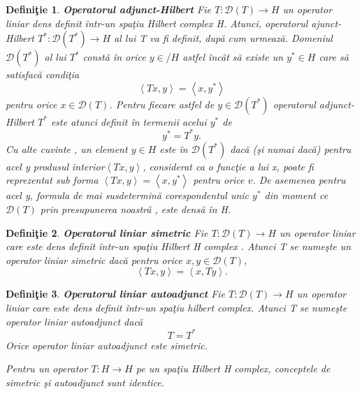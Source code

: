 \documentclass[a4paper,12pt,oneside]{report}
\newtheorem{definition}{Defini\c tie}
\begin{document}
\begin{definition} \textbf{Operatorul adjunct-Hilbert }
Fie \(T : \mathcal{D}\left ( T \right ) \rightarrow H\) un operator liniar dens definit \^{i}ntr-un spa\c{t}iu Hilbert complex H. Atunci, operatorul ajunct-Hilbert \(T^{\ast } : \mathcal{D}\left ( T^{\ast } \right ) \rightarrow H\) al lui T va fi definit, dup\u{a} cum urmeaz\u{a}. Domeniul \(\mathcal{D}\left ( T^{\ast } \right )\) al lui \(T^{\ast }\) const\u{a} \^{i}n orice \(y \in /H\) astfel \^{i}nc\^{a}t s\u{a} existe un \(y^{\ast } \in H\) care s\u{a} satisfac\u{a} condi\c{t}ia
\begin{displaymath}
\left \langle Tx,y \right \rangle = \left \langle x,y^{\ast } \right \rangle
\end{displaymath}
pentru orice \(x \in \mathcal{D}\left ( T \right )\). Pentru fiecare astfel de \(y \in \mathcal{D}\left ( T^{\ast } \right )\) operatorul adjunct-Hilbert \(T^{\ast }\) este atunci definit \^{i}n termenii acelui \(y^{\ast }\) de
\begin{displaymath}
y^{\ast } = T^{\ast }y.
\end{displaymath}
Cu alte cuvinte , un element \(y\in H\) este \^{i}n \(\mathcal{D}\left ( T^{\ast } \right )\) dac\u{a} (\c{s}i numai dac\u{a}) pentru acel y produsul interior\(\left \langle Tx,y \right \rangle \), considerat ca o func\c{t}ie a lui x, poate fi reprezentat sub forma  \(\left \langle Tx,y \right \rangle = \left \langle x,y^{\ast } \right \rangle\) pentru orice \(v\). De asemenea pentru acel y, formula de mai susdetermin\u{a} corespondentul unic \(y^{\ast }\) din moment ce \(\mathcal{D}\left ( T \right )\) prin presupunerea noastr\u{a} , este dens\u{a} \^{i}n H.
\end{definition}
\begin{definition}\textbf{Operatorul liniar simetric }
Fie \(T :  \mathcal{D}\left ( T \right ) \rightarrow H\) un operator liniar care este dens definit \^{i}ntr-un spa\c{t}iu Hilbert H complex . Atunci T se nume\c{s}te un operator liniar simetric dac\u{a} pentru orice \(x,y\in \mathcal{D}\left ( T \right )\),
\begin{displaymath}
\left \langle Tx,y \right \rangle = \left \langle x,Ty \right \rangle.
\end{displaymath}
\end{definition}
\begin{definition}\textbf{Operatorul liniar autoadjunct}
Fie \(T :  \mathcal{D}\left ( T \right ) \rightarrow H \) un operator liniar care este dens definit \^{i}ntr-un spa\c{t}iu hilbert complex. Atunci T se nume\c{s}te operator liniar autoadjunct dac\u{a}
\begin{displaymath}
T = T^{\ast }
\end{displaymath}
Orice operator liniar autoadjunct este simetric.

\noindent Pentru un operator \(T : H \rightarrow H\) pe un spa\c{t}iu Hilbert H complex, conceptele de simetric \c{s}i autoadjunct sunt identice.
\end{definition}
\end{document}
